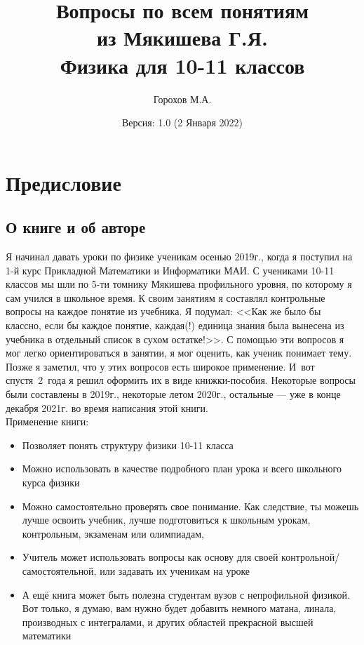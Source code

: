 \documentclass[12pt,a4paper]{report}
\title{Вопросы по всем понятиям\\из Мякишева Г.Я.\\Физика для 10-11 классов}
\author{Горохов М.А.}
\date{Версия: 1.0 (2 Января 2022)}
\begin{document}
\setcounter{tocdepth}{0}
\maketitle

\tableofcontents

\chapter*{Предисловие}

\section{О книге и об авторе}
Я начинал давать уроки по физике ученикам осенью 2019г., когда я поступил на 1-й курс Прикладной Математики и Информатики МАИ. С учениками 10-11 классов мы шли по 5-ти томнику Мякишева профильного уровня, по которому я сам учился в школьное время. К своим занятиям я составлял контрольные вопросы на каждое понятие из учебника. Я подумал: <<Как же было бы классно, если бы каждое понятие, каждая(!) единица знания была вынесена из учебника в отдельный список в сухом остатке!>>. С помощью эти вопросов я мог легко ориентироваться в занятии, я мог оценить, как ученик понимает тему. Позже я заметил, что у этих вопросов есть широкое применение. И~вот спустя~2~года я решил оформить их в виде книжки-пособия. Некоторые вопросы были составлены в 2019г., некоторые летом 2020г., остальные --- уже в конце декабря 2021г. во время написания этой книги. \\

Применение книги:
\begin{itemize}
\item Позволяет понять структуру физики 10-11 класса
\item Можно использовать в качестве подробного план урока и всего школьного курса физики
\item Можно самостоятельно проверять свое понимание. Как следствие, ты можешь лучше освоить учебник, лучше подготовиться к школьным урокам, контрольным, экзаменам или олимпиадам, 
\item Учитель может использовать вопросы как основу для своей контрольной/самостоятельной, или задавать их ученикам на уроке
\item А ещё книга может быть полезна студентам вузов с непрофильной физикой. Вот только, я думаю, вам нужно будет добавить немного матана, линала, производных с интегралами, и других областей прекрасной высшей математики
\end{itemize}
\end{document}
